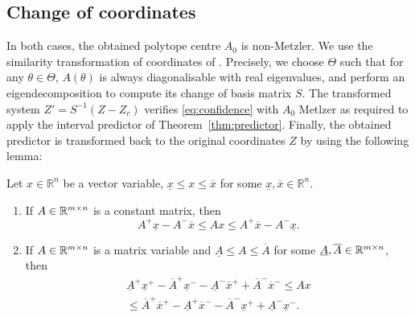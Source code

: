 \documentclass{article}
\begin{document}
\subsection{Change of coordinates}
In both cases, the obtained polytope centre $A_0$ is non-Metzler.
We use the similarity transformation of coordinates of \citet{Efimov2013}. Precisely, we choose $\Theta$ such that for any $\theta\in\Theta$, $A(\theta)$ is always diagonalisable with real eigenvalues, and perform an eigendecomposition to compute its change of basis matrix $S$. The transformed system $Z'=S^{-1}(Z-Z_c)$ verifies \eqref{eq:confidence} with $A_0$ Metlzer as required to apply the interval predictor of Theorem~\ref{thm:predictor}. Finally, the obtained predictor is transformed back to the original coordinates $Z$ by using the following lemma:
\begin{lemma}
	 \label{lem:interval} Let $x\in\mathbb{R}^{n}$ be a vector variable, $\underline{x}\le x\le\overline{x}$ for some $\underline{x},\overline{x}\in\mathbb{R}^{n}$. 
	
	\begin{enumerate}
		\item If $A\in\mathbb{R}^{m\times n}$ is a constant matrix, then
		\begin{equation}
		A^{+}\underline{x}-A^{-}\overline{x}\le Ax\le A^{+}\overline{x}-A^{-}\underline{x}.\label{eq:Interval1}
		\end{equation}
		\item If $A\in\mathbb{R}^{m\times n}$ is a matrix variable and \textup{$\underline{A}\le A\le\overline{A}$} for some $\underline{A},\overline{A}\in\mathbb{R}^{m\times n}$, then
		\begin{gather}
		\underline{A}^{+}\underline{x}^{+}-\overline{A}^{+}\underline{x}^{-}-\underline{A}^{-}\overline{x}^{+}+\overline{A}^{-}\overline{x}^{-}\leq Ax\label{eq:Interval2}\\
		\leq\overline{A}^{+}\overline{x}^{+}-\underline{A}^{+}\overline{x}^{-}-\overline{A}^{-}\underline{x}^{+}+\underline{A}^{-}\underline{x}^{-}.\nonumber 
		\end{gather}
	\end{enumerate}
\end{lemma}
\end{document}
